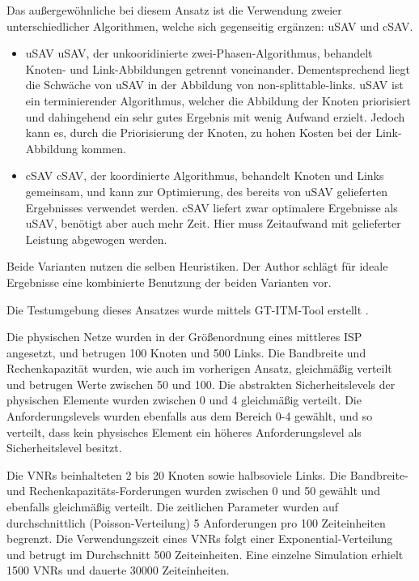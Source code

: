 \documentclass{lni}
\begin{document}
Das außergewöhnliche bei diesem Ansatz ist die Verwendung zweier unterschiedlicher Algorithmen, welche sich gegenseitig ergänzen: uSAV und cSAV.
\begin{itemize} %
	\item uSAV \newline
	uSAV, der unkooridinierte zwei-Phasen-Algorithmus, behandelt Knoten- und Link-Abbildungen getrennt voneinander. Dementsprechend liegt die Schwäche von uSAV in der Abbildung von non-splittable-links. uSAV ist ein terminierender Algorithmus, welcher die Abbildung der Knoten priorisiert und dahingehend ein sehr gutes Ergebnis mit wenig Aufwand erzielt. Jedoch kann es, durch die Priorisierung der Knoten, zu hohen Kosten bei der Link-Abbildung kommen.

	\item cSAV \newline
	cSAV, der koordinierte Algorithmus, behandelt Knoten und Links gemeinsam, und kann zur Optimierung, des bereits von uSAV gelieferten Ergebnisses verwendet werden. cSAV liefert zwar optimalere Ergebnisse als uSAV, benötigt aber auch mehr Zeit. Hier muss Zeitaufwand mit gelieferter Leistung abgewogen werden.

\end{itemize} 

Beide Varianten nutzen die selben Heuristiken. Der Author schlägt für ideale Ergebnisse eine kombinierte Benutzung der beiden Varianten vor.

Die Testumgebung dieses Ansatzes wurde mittels GT-ITM-Tool erstellt \cite{GT-ITM-Tool}. 

Die physischen Netze wurden in der Größenordnung eines mittleres ISP angesetzt, und betrugen 100 Knoten und 500 Links. Die Bandbreite und Rechenkapazität wurden, wie auch im vorherigen Ansatz, gleichmäßig verteilt und betrugen Werte zwischen 50 und 100. Die abstrakten Sicherheitslevels der physischen Elemente wurden zwischen 0 und 4 gleichmäßig verteilt. Die Anforderungslevels wurden ebenfalls aus dem Bereich 0-4 gewählt, und so verteilt, dass kein physisches Element ein höheres Anforderungslevel als Sicherheitslevel besitzt.

Die VNRs beinhalteten 2 bis 20 Knoten sowie halbsoviele Links. Die Bandbreite- und Rechenkapazitäts-Forderungen wurden zwischen 0 und 50 gewählt und ebenfalls gleichmäßig verteilt.
Die zeitlichen Parameter wurden auf durchschnittlich (Poisson-Verteilung) 5 Anforderungen pro 100 Zeiteinheiten begrenzt. Die Verwendungszeit eines VNRs folgt einer Exponential-Verteilung und betrugt im Durchschnitt 500 Zeiteinheiten. Eine einzelne Simulation erhielt 1500 VNRs und dauerte 30000 Zeiteinheiten. 
\end{document}
